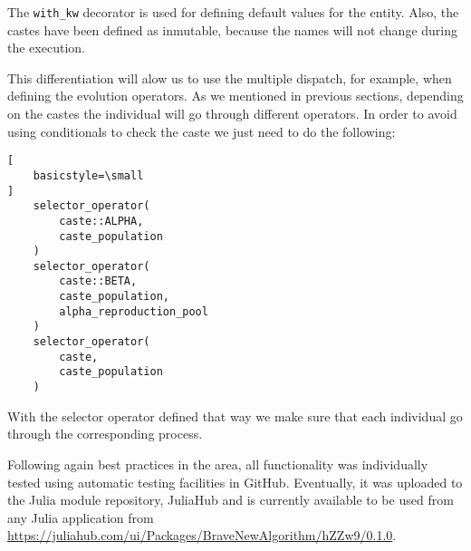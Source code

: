 The \lstinline{with_kw} decorator is used for defining default values for the entity. Also, the castes have been defined as inmutable,
because the names will not change during the execution.

This differentiation will alow us to use the multiple dispatch, for example,
when defining the evolution operators. As we mentioned in previous sections,
depending on the castes the individual will go through different operators. In
order to avoid using conditionals to check the caste we just need to do the
following:

\begin{lstlisting}[
    basicstyle=\small
]
    selector_operator(
        caste::ALPHA, 
        caste_population
    )
    selector_operator(
        caste::BETA, 
        caste_population, 
        alpha_reproduction_pool
    )
    selector_operator(
        caste, 
        caste_population
    )
\end{lstlisting}

With the selector operator defined that way we make sure that each individual go through the corresponding process.


Following again best practices in the area, all functionality was individually
tested using automatic testing facilities in GitHub. Eventually, it was uploaded
to the Julia module repository, JuliaHub and is currently available to be used
from any Julia application from
\url{https://juliahub.com/ui/Packages/BraveNewAlgorithm/hZZw9/0.1.0}.
